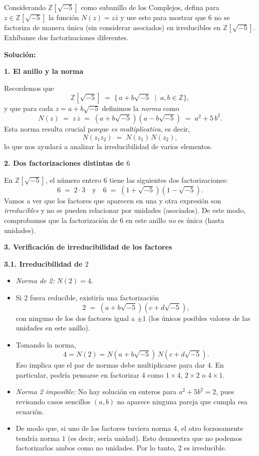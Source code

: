 Considerando $\mathbb{Z}[\sqrt{-5}]$ como subanillo de los Complejos, defina para $z \in \mathbb{Z}[\sqrt{-5}]$ la función $N(z) = z\bar{z}$ y use esto para mostrar que $6$ no se factoriza de manera única (sin considerar asociados) en irreducibles en $\mathbb{Z}[\sqrt{-5}]$. Exhíbanse dos factorizaciones diferentes.

\noindent
\textbf{Solución:}

\medskip

\noindent
\textbf{1. El anillo y la norma}

\noindent
Recordemos que
\[
\mathbb{Z}[\sqrt{-5}] \;=\; \{\, a + b\sqrt{-5} \;\mid\; a,b\in\mathbb{Z}\},
\]
y que para cada \(z = a + b\sqrt{-5}\) definimos la \emph{norma} como
\[
N(z) \;=\; z \, \overline{z} 
\;=\; (a + b\sqrt{-5})(a - b\sqrt{-5})
\;=\; a^2 + 5\,b^2.
\]
Esta norma resulta crucial porque \emph{es multiplicativa}, es decir, 
\[
N(z_1 z_2) \;=\; N(z_1)\,N(z_2),
\]
lo que nos ayudará a analizar la irreducibilidad de varios elementos.

\bigskip

\noindent
\textbf{2. Dos factorizaciones distintas de \(6\)}

\noindent
En \(\mathbb{Z}[\sqrt{-5}]\), el número entero \(6\) tiene las siguientes dos factorizaciones:
\[
6 \;=\; 2 \cdot 3
\quad\text{y}\quad
6 \;=\; (1 + \sqrt{-5})(1 - \sqrt{-5}).
\]
Vamos a ver que los factores que aparecen en una y otra expresión son \emph{irreducibles} y no se pueden relacionar por unidades (asociados). De este modo, comprobamos que la factorización de \(6\) en este anillo \emph{no} es única (hasta unidades).

\bigskip

\noindent
\textbf{3. Verificación de irreducibilidad de los factores}

\medskip

\noindent
\textbf{3.1. Irreducibilidad de \(2\)}

\begin{itemize}
    \item \emph{Norma de 2:} \(N(2) = 4\).
    \item Si \(2\) fuera reducible, existiría una factorización 
    \[
    2 \;=\; (a + b\sqrt{-5})(c + d\sqrt{-5}),
    \]
    con ninguno de los dos factores igual a \(\pm 1\) (los únicos posibles valores de las unidades en este anillo).  
    \item Tomando la norma, 
    \[
    4 = N(2) = N(a + b\sqrt{-5})\, N(c + d\sqrt{-5}).
    \]
    Eso implica que el par de normas debe multiplicarse para dar \(4\). En particular, podría pensarse en factorizar \(4\) como \(1 \times 4\), \(2 \times 2\) o \(4 \times 1\).
    \item \emph{Norma 2 imposible:} No hay solución en enteros para \(a^2 + 5 b^2 = 2\), pues revisando casos sencillos \((a,b)\) no aparece ninguna pareja que cumpla esa ecuación.  
    \item De modo que, si uno de los factores tuviera norma \(4\), el otro forzosamente tendría norma \(1\) (es decir, sería unidad). Esto demuestra que no podemos factorizarlos ambos como no unidades. Por lo tanto, \(2\) es irreducible.
\end{itemize}

